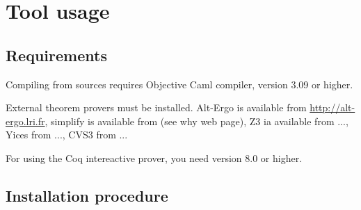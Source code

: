 \documentclass[a4paper,11pt,twoside,openright]{report}
\begin{document}




\chapter{Tool usage}

\section{Requirements}
\label{app:requirements}


Compiling from sources requires Objective Caml
compiler, version 3.09 or higher. 

External theorem provers must be installed. Alt-Ergo is available from
\url{http://alt-ergo.lri.fr}, simplify is available from \url{} (see why
web page), Z3 ia available from ..., Yices from ..., CVS3 from ...

For using the Coq intereactive prover, you need \Coq{} version 8.0 or
higher.

\section{Installation procedure}
\end{document}
